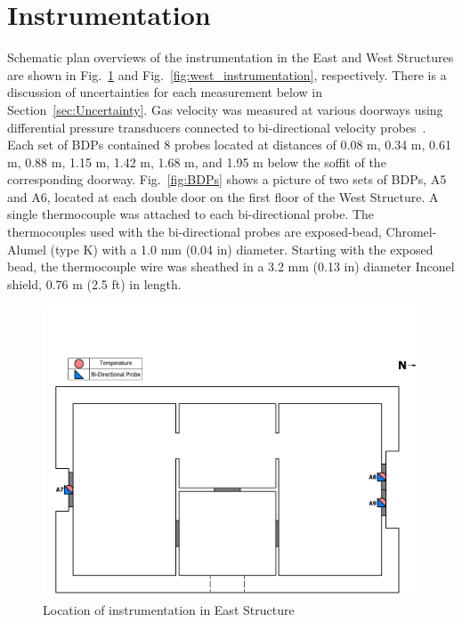 \documentclass[12pt,oneside]{book}
\begin{document}
\section{Instrumentation}
\label{sec:Instrumentation}
Schematic plan overviews of the instrumentation in the East and West Structures are shown in Fig.~\ref{fig:east_instrumentation} and Fig.~\ref{fig:west_instrumentation}, respectively. There is a discussion of uncertainties for each measurement below in Section~\ref{sec:Uncertainty}. Gas velocity was measured at various doorways using differential pressure transducers connected to bi-directional velocity probes~\cite{McCaffrey:Combustion_and_Flame}. Each set of BDPs contained 8 probes located at distances of 0.08 m, 0.34 m, 0.61 m, 0.88 m, 1.15 m, 1.42 m, 1.68 m, and 1.95 m below the soffit of the corresponding doorway. Fig.~\ref{fig:BDPs} shows a picture of two sets of BDPs, A5 and A6, located at each double door on the first floor of the West Structure. A single thermocouple was attached to each bi-directional probe. The thermocouples used with the bi-directional probes are exposed-bead, Chromel-Alumel (type K) with a 1.0 mm (0.04 in) diameter. Starting with the exposed bead, the thermocouple wire was sheathed in a 3.2 mm (0.13 in) diameter Inconel shield, 0.76 m (2.5 ft) in length.


\begin{figure}[!ht]
\includegraphics[trim=0cm 0cm 0.25cm 3.75cm, clip=true, width=6in]{../Drawings/Instrumentation/East_Structure_Devices_Hose_Test}
\caption[Location of Instrumentation in East Structure]{Location of instrumentation in East Structure}
\label{fig:east_instrumentation}
\end{figure}
\end{document}
